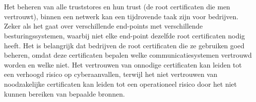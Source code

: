 
%
%
%
%
%

%



\chapter*{}


Het beheren van alle truststores en hun trust (de root certificaten die men vertrouwt), binnen een netwerk kan een tijdrovende taak zijn voor bedrijven. Zeker als het gaat over verschillende end-points met verschillende besturingssystemen, waarbij niet elke end-point dezelfde root certificaten nodig heeft.
Het is belangrijk dat bedrijven de root certificaten die ze gebruiken goed beheren, omdat deze certificaten bepalen welke communicatiesystemen vertrouwd worden en welke niet. 
Het vertrouwen van onnodige certificaten kan leiden tot een verhoogd risico op cyberaanvallen, terwijl het niet vertrouwen van noodzakelijke certificaten kan leiden tot een operationeel risico door het niet kunnen bereiken van bepaalde bronnen. \\


